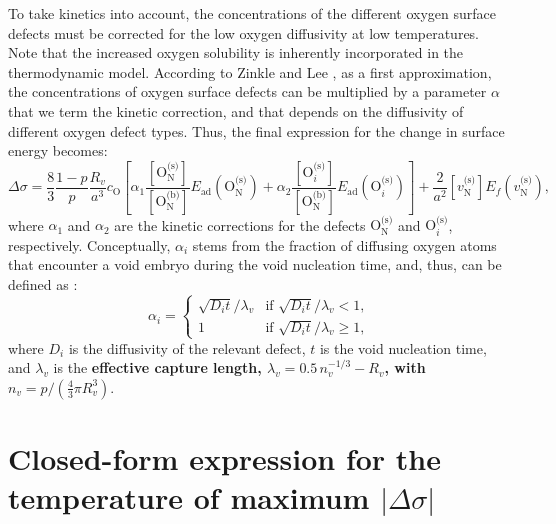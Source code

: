 \documentclass[preprint,12pt,sort&compress]{elsarticle}
\newcommand{\?}{\stackrel{?}{=}}
\providecommand{\DIFaddtex}[1]{{\bf #1}} %
\providecommand{\DIFdeltex}[1]{} %
\providecommand{\DIFaddbegin}{\protect\color{blue}} %
\providecommand{\DIFaddend}{\protect\color{black}} %
\providecommand{\DIFdelbegin}{\protect\color{red}} %
\providecommand{\DIFdelend}{\protect\color{black}} %
\providecommand{\DIFadd}[1]{\texorpdfstring{\DIFaddtex{#1}}{#1}} %
\providecommand{\DIFdel}[1]{\texorpdfstring{\DIFdeltex{#1}}{}} %
\begin{document}
To take kinetics into account, the concentrations of the different oxygen surface defects must be corrected for the low oxygen diffusivity at low temperatures. Note that the increased oxygen solubility is inherently incorporated in the thermodynamic model. According to Zinkle and Lee \cite{Zinkle1990}, as a first approximation, the concentrations of oxygen surface defects can be multiplied by a parameter $\alpha$ that we term the kinetic correction, and that depends on the diffusivity of different oxygen defect types. Thus, the final expression for the change in surface energy becomes:
\begin{equation}
\Delta \sigma = \frac{8}{3} \frac{1-p}{p} \frac{R_v}{a^3} c_\text{O} \left[ \alpha_1 \frac{ [ \text{O}_\text{N}^{\text{(s)}} ] }{ [ \text{O}_\text{N}^{\text{(b)}} ] }  E_\text{ad}( \text{O}_\text{N}^{\text{(s)}} ) + \alpha_2 \frac{ [ \text{O}_i^{\text{(s)}} ] }{ [ \text{O}_\text{N}^{\text{(b)}} ] }  E_\text{ad}( \text{O}_i^{\text{(s)}} ) \right] + \frac{2}{a^2} [ v_\text{N}^{\text{(s)}} ] E_f ( v_\text{N}^{\text{(s)}} ),
\end{equation}
where $\alpha_1$ and $\alpha_2$ are the kinetic corrections for the defects $\text{O}_\text{N}^\text{(s)}$ and $\text{O}_i^{\text{(s)}}$, respectively. Conceptually, $\alpha_i$ stems from the fraction of diffusing oxygen atoms that encounter a void embryo during the void nucleation time, and, thus, can be defined as \cite{Zinkle1990}:
\begin{equation}
\alpha_i =
\begin{cases}
    \sqrt{D_i t}/\lambda_v & \text{if } \sqrt{D_i t}/\lambda_v < 1, \\
    1 & \text{if } \sqrt{D_i t}/\lambda_v \geq 1,
\end{cases}    
\end{equation}
where $D_i$ is the diffusivity of the relevant defect, $t$ is the void nucleation time, and $\lambda_v$ is the \DIFdelbegin \DIFdel{mean free path between voids, defined as $\lambda_v = n_v^{-1/3}$ \cite{Olander2021}, where }\DIFdelend \DIFaddbegin \DIFadd{effective capture length, $\lambda_v=0.5\,n_v^{-1/3}-R_v$, with }\DIFaddend $n_v = p / ( \frac{4}{3} \pi R_v^3 ) $\DIFdelbegin \DIFdel{is the void number density}\DIFdelend .

\FloatBarrier

\section{Closed-form expression for the temperature of maximum $|\Delta \sigma|$}
\label{App:Tpeak}
\end{document}
